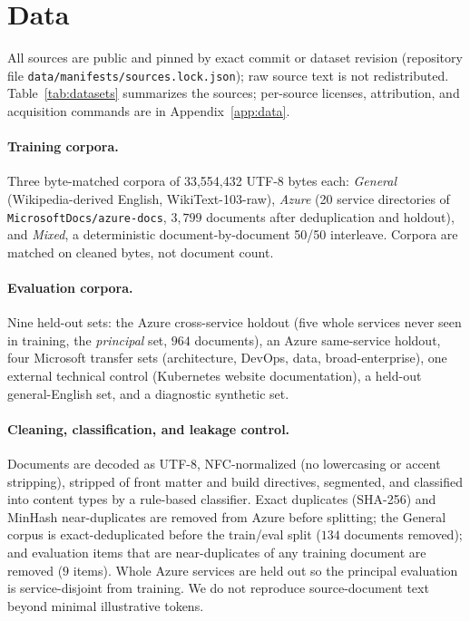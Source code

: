 \section{Data}
\label{sec:data}

All sources are public and pinned by exact commit or dataset revision (repository
file \texttt{data/manifests/sources.lock.json}); raw source text is not
redistributed. Table~\ref{tab:datasets} summarizes the sources; per-source
licenses, attribution, and acquisition commands are in Appendix~\ref{app:data}.

\begin{table}[t]
\centering
\caption{Public sources, roles, retained Markdown file counts, and licenses.
Sources are pinned by commit; raw text is not redistributed.}
\label{tab:datasets}
\small

\end{table}

\paragraph{Training corpora.} Three byte-matched corpora of 33{,}554{,}432 UTF-8
bytes each: \emph{General} (Wikipedia-derived English, WikiText-103-raw),
\emph{Azure} (20 service directories of \texttt{MicrosoftDocs/azure-docs},
$3{,}799$ documents after deduplication and holdout), and \emph{Mixed}, a
deterministic document-by-document 50/50 interleave. Corpora are matched on
cleaned bytes, not document count.

\paragraph{Evaluation corpora.} Nine held-out sets: the Azure cross-service
holdout (five whole services never seen in training, the \emph{principal} set,
$964$ documents), an Azure same-service holdout, four Microsoft transfer sets
(architecture, DevOps, data, broad-enterprise), one external technical control
(Kubernetes website documentation), a held-out general-English set, and a
diagnostic synthetic set.

\paragraph{Cleaning, classification, and leakage control.} Documents are decoded
as UTF-8, NFC-normalized (no lowercasing or accent stripping), stripped of front
matter and build directives, segmented, and classified into content types by a
rule-based classifier. Exact duplicates (SHA-256) and MinHash near-duplicates are
removed from Azure before splitting; the General corpus is exact-deduplicated
before the train/eval split ($134$ documents removed); and evaluation items that
are near-duplicates of any training document are removed ($9$ items). Whole Azure
services are held out so the principal evaluation is service-disjoint from
training. We do not reproduce source-document text beyond minimal illustrative
tokens.
